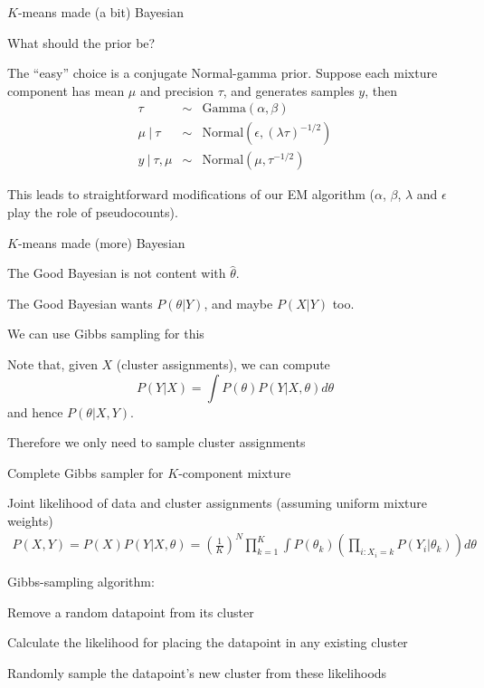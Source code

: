 \documentclass{beamer}
\begin{document}
\begin{frame}{$K$-means made (a bit) Bayesian}

What should the prior be?

The ``easy'' choice is a conjugate Normal-gamma prior.
Suppose each mixture component has mean $\mu$ and precision $\tau$, and generates samples $y$, then
\begin{eqnarray*}
\tau & \sim & \mbox{Gamma}(\alpha,\beta) \\
\mu\ |\ \tau & \sim & \mbox{Normal}(\epsilon,(\lambda \tau)^{-1/2}) \\
y\ |\ \tau, \mu & \sim & \mbox{Normal}(\mu,\tau^{-1/2})
\end{eqnarray*}

This leads to straightforward modifications of our EM algorithm
 ($\alpha$, $\beta$, $\lambda$ and $\epsilon$ play the role of pseudocounts).

\end{frame}

\begin{frame}{$K$-means made (more) Bayesian}

The Good Bayesian is not content with $\hat{\theta}$.

The Good Bayesian wants $P(\theta|Y)$, and maybe $P(X|Y)$ too.

\itemb
\item We can use Gibbs sampling for this
\item Note that, given $X$ (cluster assignments), we can compute
\[
P(Y|X) = \int P(\theta)P(Y|X,\theta) d\theta
\]
and hence $P(\theta|X,Y)$.
\item Therefore we only need to sample cluster assignments
\iteme

\end{frame}


\begin{frame}{Complete Gibbs sampler for $K$-component mixture}

Joint likelihood of data and cluster assignments (assuming uniform mixture weights)
\begin{eqnarray*}
P(X,Y) = P(X) P(Y|X,\theta) = \left( \frac{1}{K} \right)^N \prod_{k=1}^K \int P(\theta_k) \left( \prod_{i: X_i = k} P(Y_i|\theta_k) \right) d\theta
\end{eqnarray*}

Gibbs-sampling algorithm:
\itemb
\item Remove a random datapoint from its cluster
\item Calculate the likelihood for placing the datapoint in any existing cluster
\item Randomly sample the datapoint's new cluster from these likelihoods
\iteme

\end{frame}
\end{document}
